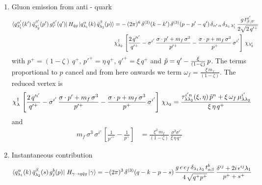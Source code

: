 \documentclass[9pt]{article}
\numberwithin{equation}{section}
\begin{document}
\begin{enumerate}
\begin{align}
\end{align}
\item  Gluon emission from anti - quark
\begin{align}
    \bra{q^{\alpha'}_{\lambda'_{1}}(k')\,\Bar{q}^{\beta'}_{\lambda'_{2}}(p')\,g^{a'}_{i'}(q')}H_{\Bar{q}g}\ket{q^{\alpha}_{\lambda_{1}}(k)\,\Bar{q}^{\beta}_{\lambda_{2}}(p)} & = -\,(2\pi)^{6}\, \delta^{(3)}(k-k')\, \delta^{(3)}(p-p'-q')\,\delta_{\alpha'\,\alpha}\,\delta_{\lambda_{1}\,\lambda'_{1}}\, \frac{g\,t^{a'}_{\beta\,\beta'}}{2\sqrt{2\,q'^{+}}} \notag \\ & \chi^{\dagger}_{\lambda_{2}}\,\left[\frac{2\,q'^{i'}}{q'^{+}}-\sigma^{i'}\,\frac{\sigma\cdot p' +m_{f}\,\sigma^{3}}{p'^{+}}-\frac{\sigma\cdot p +m_{f}\,\sigma^{3}}{p^{+}}\,\sigma^{i'}\right]\,\chi_{\lambda'_{2}}
\end{align}
with $p^{+} = (1-\zeta)\, q^{+},\, p'^{+} = \eta\,q^{+}, \, q'^{+} = \xi\,q^{+}$ and $\Tilde{p} = q' - \frac{\xi}{(1-\zeta)}\, p $. The terms proportional to $p$ cancel and from here onwards we term $\omega_{f} = \frac{\xi\, m_{f}}{(1-\zeta)}$. The reduced vertex is 
\begin{align}
\chi^{\dagger}_{\lambda}\,\left[\frac{2\,q'^{i'}}{q'^{+}}-\sigma^{i'}\,\frac{\sigma\cdot p' +m_{f}\,\sigma^{3}}{p'^{+}}-\frac{\sigma\cdot p +m_{f}\,\sigma^{3}}{p^{+}}\,\sigma^{i'}\right]\,\chi_{\lambda_{2}} & = \frac{\tau^{i'n}_{\lambda\lambda_{2}}(\xi,\eta)\,\Tilde{p}^{n}+\xi\,\omega_{f}\,\mu^{i'}_{\lambda\lambda_{2}}}{\xi\,\eta\,q^{+}}
\end{align}
and 
\begin{align}
m_{f}\,\sigma^{3}\,\sigma^{i'}\,\left[\frac{1}{p'^{+}}-\frac{1}{p^{+}}\right] & = \frac{\xi^{2}\,m_{f}}{(1-\zeta)}\,\frac{\sigma^{3}\sigma^{i'}}{\xi\,\eta\,q^{+}}
\end{align}
\item  Instantaneous contribution
\begin{align}
    \bra{q^{\alpha}_{\lambda_{1}}(k)\,\Bar{q}^{\beta}_{\lambda_{2}}(s)\,g^{b}_{j}(p)}\,H_{\gamma\rightarrow q\Bar{q}g}\ket{\gamma} & = -(2\pi)^{3}\, \delta^{(3)}(q-k-p-s)\, \frac{g\,e\,e_{f}\,\delta_{\lambda_{1}\lambda_{2}}\,t^{b}_{\alpha\beta}}{4\,\sqrt{q^{+}p^{+}}}\, \frac{\delta^{ij}+2i\,\epsilon^{ij}\lambda_{1}}{p^{+}+s^{+}}
\end{align}
\end{enumerate}
\end{document}
